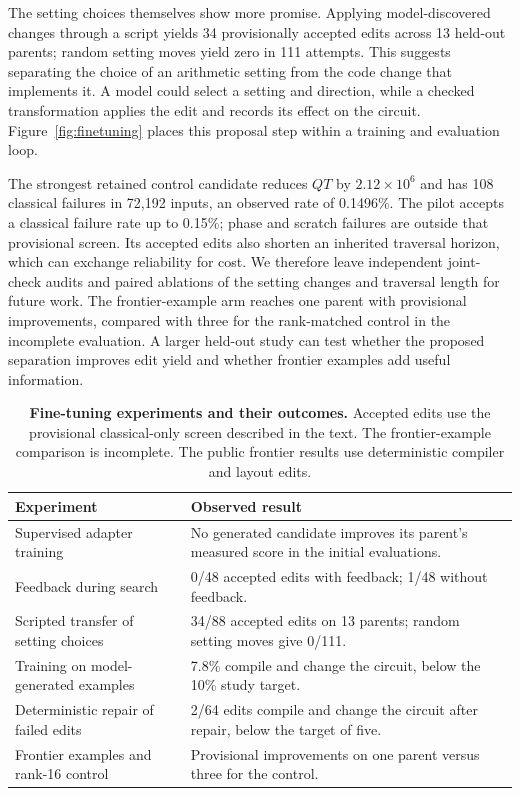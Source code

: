 \documentclass[aps,prx,reprint,raggedbottom,superscriptaddress,longbibliography,floatfix]{revtex4-2}
\begin{document}
The setting choices themselves show more promise.
Applying model-discovered changes through a script yields 34 provisionally accepted edits across 13 held-out parents; random setting moves yield zero in 111 attempts.
This suggests separating the choice of an arithmetic setting from the code change that implements it.
A model could select a setting and direction, while a checked transformation applies the edit and records its effect on the circuit.
Figure~\ref{fig:finetuning} places this proposal step within a training and evaluation loop.

The strongest retained control candidate reduces $QT$ by $2.12\times10^6$ and has 108 classical failures in 72,192 inputs, an observed rate of 0.1496\%.
The pilot accepts a classical failure rate up to 0.15\%; phase and scratch failures are outside that provisional screen.
Its accepted edits also shorten an inherited traversal horizon, which can exchange reliability for cost.
We therefore leave independent joint-check audits and paired ablations of the setting changes and traversal length for future work.
The frontier-example arm reaches one parent with provisional improvements, compared with three for the rank-matched control in the incomplete evaluation.
A larger held-out study can test whether the proposed separation improves edit yield and whether frontier examples add useful information.

\begin{table}[!tp]
\caption{\textbf{Fine-tuning experiments and their outcomes.}
Accepted edits use the provisional classical-only screen described in the text.
The frontier-example comparison is incomplete.
The public frontier results use deterministic compiler and layout edits.}
\label{tab:finetuning}
\centering
\begin{tabular}{p{}p{}}
\toprule
Experiment & Observed result \\
\midrule
Supervised adapter training & No generated candidate improves its parent's measured score in the initial evaluations. \\
Feedback during search & 0/48 accepted edits with feedback; 1/48 without feedback. \\
Scripted transfer of setting choices & 34/88 accepted edits on 13 parents; random setting moves give 0/111. \\
Training on model-generated examples & 7.8\% compile and change the circuit, below the 10\% study target. \\
Deterministic repair of failed edits & 2/64 edits compile and change the circuit after repair, below the target of five. \\
Frontier examples and rank-16 control & Provisional improvements on one parent versus three for the control. \\
\bottomrule
\end{tabular}
\end{table}
\end{document}
